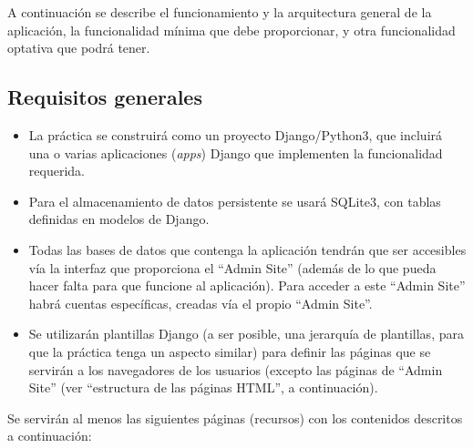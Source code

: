 A continuación se describe el funcionamiento y la arquitectura general de la aplicación, la funcionalidad mínima que debe proporcionar, y otra funcionalidad optativa que podrá tener.

\subsection{Requisitos generales}

\begin{itemize}

\item La práctica se construirá como un proyecto Django/Python3, que incluirá una o varias aplicaciones (\emph{apps}) Django que implementen la funcionalidad requerida.

\item Para el almacenamiento de datos persistente se usará SQLite3, con tablas definidas en modelos de Django.

\item Todas las bases de datos que contenga la aplicación tendrán que ser accesibles vía la interfaz que proporciona el ``Admin Site'' (además de lo que pueda hacer falta para que funcione al aplicación). Para acceder a este ``Admin Site'' habrá cuentas específicas, creadas vía el propio ``Admin Site''.

\item Se utilizarán plantillas Django (a ser posible, una jerarquía de plantillas, para que la práctica tenga un aspecto similar) para definir las páginas que se servirán a los navegadores de los usuarios (excepto las páginas de ``Admin Site'' (ver ``estructura de las páginas HTML'', a continuación).

\end{itemize}

Se servirán al menos las siguientes páginas (recursos) con los contenidos descritos a continuación:

